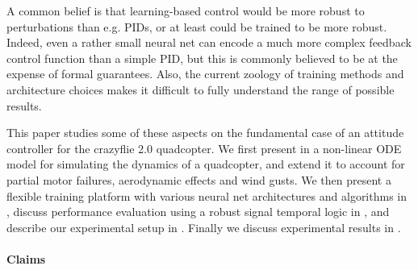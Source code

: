 \documentclass[anonymous=true,format=sigconf, screen=true, review=false]{acmart}
\begin{document}
A common belief is that learning-based control would be more robust to perturbations than e.g. PIDs, or at least could be trained to be more robust. Indeed, even a rather small neural net can encode a much more complex feedback control function than a simple PID, but this is commonly believed to be at the expense of formal guarantees. Also, the current zoology of training methods and architecture choices makes it difficult to fully understand the range of possible results. 

This paper studies some of these aspects on the fundamental case of an attitude controller for  the crazyflie 2.0 \cite{nanoquadcop} quadcopter. We first present in  a non-linear ODE model for simulating the dynamics of a quadcopter, and extend it to account for partial motor failures, aerodynamic effects and wind gusts. We then present a flexible training platform with various neural net architectures and algorithms in  
, discuss performance evaluation using a robust signal temporal logic in , and describe our experimental setup in . Finally we discuss experimental results in . %

\paragraph{Claims}
\end{document}
